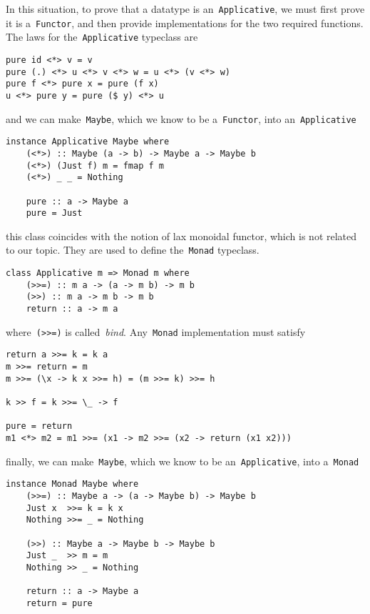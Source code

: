 \documentclass[a4paper]{article}
\theoremstyle{plain}
\theoremstyle{definition}
\begin{document}
In this situation, to prove that a datatype is
an~\texttt{Applicative}, we must first prove it is
a~\texttt{Functor}, and then provide implementations for the two
required functions.
The laws for the~\texttt{Applicative} typeclass are
\begin{verbatim}
pure id <*> v = v
pure (.) <*> u <*> v <*> w = u <*> (v <*> w)
pure f <*> pure x = pure (f x)
u <*> pure y = pure ($ y) <*> u
\end{verbatim}
and we can make~\texttt{Maybe}, which we know to be
a~\texttt{Functor}, into an~\texttt{Applicative}
\begin{verbatim}
instance Applicative Maybe where
    (<*>) :: Maybe (a -> b) -> Maybe a -> Maybe b
    (<*>) (Just f) m = fmap f m
    (<*>) _ _ = Nothing

    pure :: a -> Maybe a
    pure = Just
\end{verbatim}
this class coincides with the notion of lax monoidal functor, which is not
related to our topic. They are used to define the~\texttt{Monad}
typeclass.

\begin{verbatim}
class Applicative m => Monad m where
    (>>=) :: m a -> (a -> m b) -> m b
    (>>) :: m a -> m b -> m b
    return :: a -> m a
\end{verbatim}
where~\texttt{(>>=)} is called~\emph{bind}.
Any~\texttt{Monad} implementation must satisfy
\begin{verbatim}
return a >>= k = k a
m >>= return = m
m >>= (\x -> k x >>= h) = (m >>= k) >>= h

k >> f = k >>= \_ -> f

pure = return
m1 <*> m2 = m1 >>= (x1 -> m2 >>= (x2 -> return (x1 x2)))
\end{verbatim}
finally, we can make~\texttt{Maybe}, which we know to be
an~\texttt{Applicative}, into a~\texttt{Monad}
\begin{verbatim}
instance Monad Maybe where
    (>>=) :: Maybe a -> (a -> Maybe b) -> Maybe b
    Just x  >>= k = k x
    Nothing >>= _ = Nothing

    (>>) :: Maybe a -> Maybe b -> Maybe b
    Just _  >> m = m
    Nothing >> _ = Nothing

    return :: a -> Maybe a
    return = pure
\end{verbatim}
\end{document}
